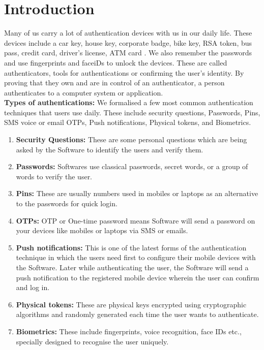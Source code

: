 \section{Introduction}
Many of us carry a lot of authentication devices with us in our daily life. These devices include a car key, house key, corporate badge, bike key, RSA token, bus pass, credit card, driver's license, ATM card \cite{197318}. We also remember the passwords and use fingerprints and faceiDs to unlock the devices. These are called authenticators, tools for authentications or confirming the user's identity. By proving that they own and are in control of an authenticator, a person authenticates to a computer system or application. \\
\textbf{Types of authentications:} We formalised a few most common authentication techniques that users use daily. These include security questions, Passwords, Pins, SMS voice or email OTPs, Push notifications, Physical tokens, and Biometrics.
\begin{enumerate}
    \item \textbf{Security Questions:} These are some personal questions which are being asked by the Software to identify the users and verify them.
    \item \textbf{Passwords:} Softwares use classical passwords, secret words, or a group of words to verify the user. 
    \item \textbf{Pins:} These are usually numbers used in mobiles or laptops as an alternative to the passwords for quick login. 
    \item \textbf{OTPs:} OTP or One-time password means Software will send a password on your devices like mobiles or laptops via SMS or emails.
    \item \textbf{Push notifications:} This is one of the latest forms of the authentication technique in which the users need first to configure their mobile devices with the Software. Later while authenticating the user, the Software will send a push notification to the registered mobile device wherein the user can confirm and log in. 
    \item \textbf{Physical tokens:} These are physical keys encrypted using cryptographic algorithms and randomly generated each time the user wants to authenticate.
    \item \textbf{Biometrics:} These include fingerprints, voice recognition, face IDs etc., specially designed to recognise the user uniquely.
\end{enumerate}
